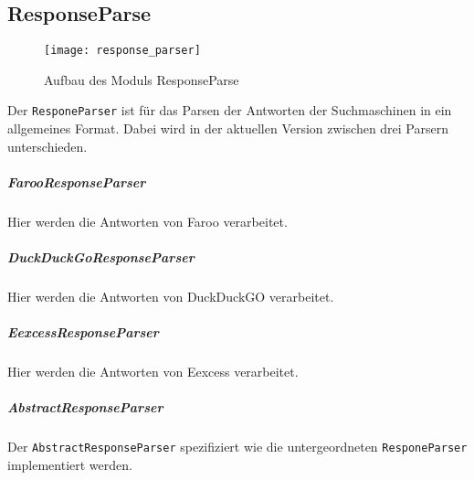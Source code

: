 
\subsection{ResponseParse}
\begin{figure}[htb]
	\centering
		\texttt{[image: response\_parser]}
		\caption{Aufbau des Moduls ResponseParse}
		\label{fig:Aufbau des Moduls ResponseParse}
\end{figure}
Der \lstinline|ResponeParser| ist für das Parsen der Antworten der Suchmaschinen in ein allgemeines Format.
Dabei wird in der aktuellen Version zwischen drei Parsern unterschieden.
\subparagraph{FarooResponseParser}
Hier werden die Antworten von Faroo verarbeitet.
\subparagraph{DuckDuckGoResponseParser}
Hier werden die Antworten von DuckDuckGO verarbeitet.
\subparagraph{EexcessResponseParser}
Hier werden die Antworten von Eexcess verarbeitet.
\subparagraph{AbstractResponseParser}
Der \lstinline|AbstractResponseParser| spezifiziert wie die untergeordneten \lstinline|ResponeParser| implementiert werden.

